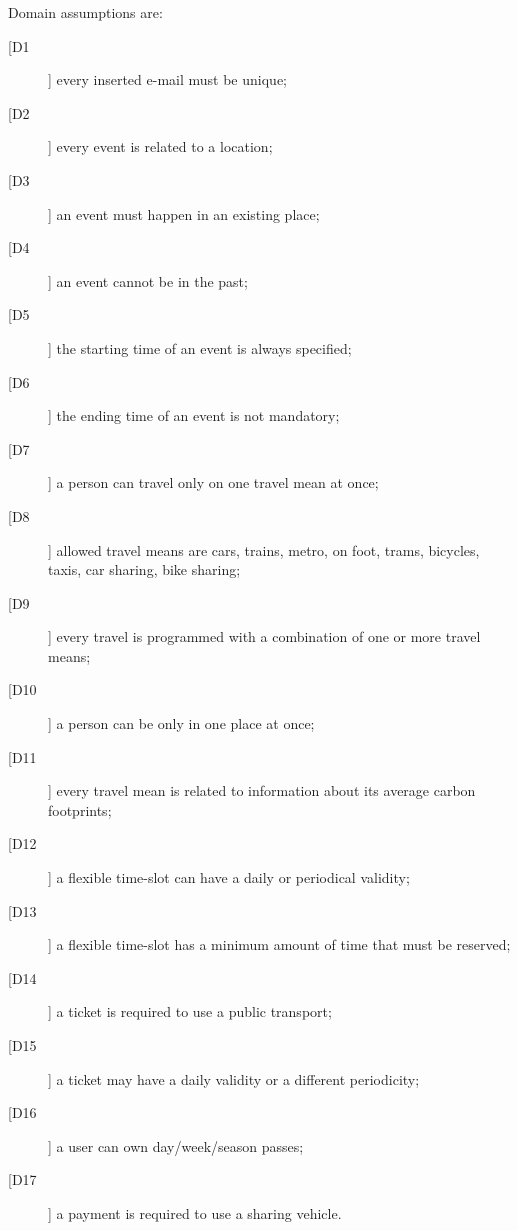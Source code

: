 Domain assumptions are:
\begin{description}
\item[[D1]] every inserted e-mail must be unique;
\item[[D2]] every event is related to a location;
\item[[D3]] an event must happen in an existing place;
\item[[D4]] an event cannot be in the past;
\item[[D5]] the starting time of an event is always specified;
\item[[D6]] the ending time of an event is not mandatory;
\item[[D7]] a person can travel only on one travel mean at once; 
\item[[D8]] allowed travel means are cars, trains, metro, on foot, trams, bicycles, taxis, car sharing, bike sharing;
\item[[D9]] every travel is programmed with a combination of one or more travel means;
\item[[D10]] a person can be only in one place at once;
\item[[D11]] every travel mean is related to information about its average carbon footprints; 
\item[[D12]] a flexible time-slot can have a daily or periodical validity;
\item[[D13]] a flexible time-slot has a minimum amount of time that must be reserved;
\item[[D14]] a ticket is required to use a public transport;
\item[[D15]] a ticket may have a daily validity or a different periodicity;
\item[[D16]] a user can own day/week/season passes;
\item[[D17]] a payment is required to use a sharing vehicle.
\end{description}

